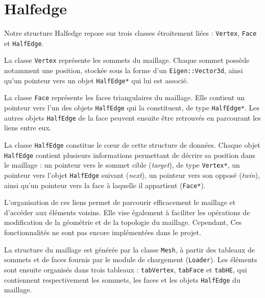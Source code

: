 \documentclass[12pt,a4paper]{article}
\begin{document}
\vspace{4cm}
\newpage
\section{Halfedge}


Notre structure Halfedge repose sur trois classes étroitement liées : \texttt{Vertex}, \texttt{Face} et \texttt{HalfEdge}.


La classe \texttt{Vertex} représente les sommets du maillage. Chaque sommet possède notamment une position, stockée sous la forme d'un \texttt{Eigen::Vector3d}, ainsi qu'un pointeur vers un objet \texttt{HalfEdge*} qui lui est associé.

La classe \texttt{Face} représente les faces triangulaires du maillage. Elle contient un pointeur vers l'un des objets \texttt{HalfEdge} qui la constituent, de type \texttt{HalfEdge*}. Les autres objets \texttt{HalfEdge} de la face peuvent ensuite être retrouvés en parcourant les liens entre eux.

La classe \texttt{HalfEdge} constitue le cœur de cette structure de données. Chaque objet \texttt{HalfEdge} contient plusieurs informations permettant de décrire sa position dans le maillage : un pointeur vers le sommet cible (\textit{target}), de type \texttt{Vertex*}, un pointeur vers l'objet \texttt{HalfEdge} suivant (\textit{next}), un pointeur vers son opposé (\textit{twin}), ainsi qu'un pointeur vers la face à laquelle il appartient (\texttt{Face*}).

L'organisation de ces liens permet de parcourir efficacement le maillage et d'accéder aux éléments voisins. Elle vise également à faciliter les opérations de modification de la géométrie et de la topologie du maillage. Cependant, Ces fonctionnalités ne sont pas encore implémentées dans le projet.

La structure du maillage est générée par la classe \texttt{Mesh}, à partir des tableaux de sommets et de faces fournis par le module de chargement (\texttt{Loader}). Les éléments sont ensuite organisés dans trois tableaux : \texttt{tabVertex}, \texttt{tabFace} et \texttt{tabHE}, qui contiennent respectivement les sommets, les faces et les objets \texttt{HalfEdge} du maillage.
\end{document}
